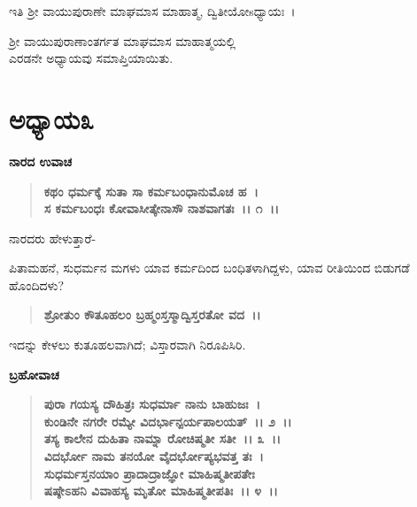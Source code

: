 \begin{center}
ಇತಿ ಶ‍್ರೀ ವಾಯುಪುರಾಣೇ ಮಾಘಮಾಸ ಮಾಹಾತ್ಮ, ದ್ವಿತೀಯೋsಧ್ಯಾಯಃ~।
\end{center}

\begin{center}
ಶ‍್ರೀ ವಾಯುಪುರಾಣಾಂತರ್ಗತ ಮಾಘಮಾಸ ಮಾಹಾತ್ಮಯಲ್ಲಿ \\ ಎರಡನೇ ಅಧ್ಯಾಯವು ಸಮಾಪ್ತಿಯಾಯಿತು.
\end{center}

\newpage

\section*{ಅಧ್ಯಾಯ\enginline{-}೩}

\begin{flushleft}
\textbf{ನಾರದ ಉವಾಚ\enginline{-}}
\end{flushleft}

\begin{verse}
\textbf{ಕಥಂ ಧರ್ಮಕ್ಕೆ ಸುತಾ ಸಾ ಕರ್ಮಬಂಧಾನುಮೊಚ ಹ~।}\\\textbf{ಸ ಕರ್ಮಬಂಧಃ ಕೋವಾಸೀತ್ಕೇನಾಸೌ ನಾಶವಾಗತಃ~।। ೧~।।}
\end{verse}

\begin{flushleft}
ನಾರದರು ಹೇಳುತ್ತಾರೆ-
\end{flushleft}

ಪಿತಾಮಹನೆ, ಸುಧರ್ಮನ ಮಗಳು ಯಾವ ಕರ್ಮದಿಂದ ಬಂಧಿತಳಾಗಿದ್ದಳು, ಯಾವ ರೀತಿಯಿಂದ ಬಿಡುಗಡೆ ಹೊಂದಿದಳು?

\begin{verse}
\textbf{ಶ್ರೋತುಂ ಕೌತೂಹಲಂ ಬ್ರಹ್ಮಂಸ್ತಸ್ಮಾದ್ವಿಸ್ತರತೋ ವದ~।।}
\end{verse}

ಇದನ್ನು ಕೇಳಲು ಕುತೂಹಲವಾಗಿದೆ; ವಿಸ್ತಾರವಾಗಿ ನಿರೂಪಿಸಿರಿ.

\begin{flushleft}
\textbf{ಬ್ರಹೋವಾಚ\enginline{-}}
\end{flushleft}

\begin{verse}
\textbf{ಪುರಾ ಗಯಸ್ಯ ದೌಹಿತ್ರಃ ಸುಧರ್ಮಾ ನಾನು ಬಾಹುಜಃ~।}\\\textbf{ಕುಂಡಿನೇ ನಗರೇ ರಮ್ಯೇ ವಿದರ್ಭಾನ್ಪರ್ಯಪಾಲಯತ್~।। ೨~।। }\\\textbf{ತಸ್ಯ ಕಾಲೇನ ದುಹಿತಾ ನಾಮ್ನಾ ರೋಚಿಷ್ಮತೀ ಸತೀ~।। ೩~।।} \\\textbf{ವಿದರ್ಭೋ ನಾಮ ತನಯೋ ವೈದರ್ಭೋಪ್ಯಭವತ್ತ ತಃ~।} \\\textbf{ಸುಧರ್ಮಸ್ತನಯಾಂ ಪ್ರಾದಾದ್ರಾಜ್ಞೋ ಮಾಹಿಷ್ಮತೀಪತೇಃ} \\\textbf{ಷಷ್ಠೇಽಹನಿ ವಿವಾಹಸ್ಯ ಮೃತೋ ಮಾಹಿಷ್ಮತೀಪತಿಃ~।। ೪~।।}
\end{verse}

